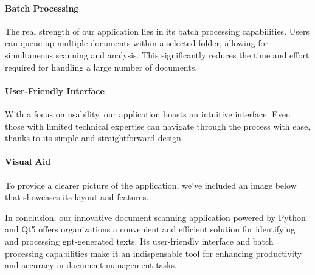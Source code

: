 \paragraph{Batch Processing} The real strength of our application lies in its batch processing capabilities. 
Users can queue up multiple documents within a selected folder, allowing for simultaneous scanning and analysis. 
This significantly reduces the time and effort required for handling a large number of documents.

\paragraph{User-Friendly Interface} With a focus on usability, our application boasts an intuitive interface. 
Even those with limited technical expertise can navigate through the process with ease, thanks to its simple and 
straightforward design.

\paragraph{Visual Aid} To provide a clearer picture of the application, we've included an image below that showcases 
its layout and features.


In conclusion, our innovative document scanning application powered by Python and Qt5 offers organizations a 
convenient and efficient solution for identifying and processing gpt-generated texts. Its user-friendly 
interface and batch processing capabilities make it an indispensable tool for enhancing productivity and accuracy 
in document management tasks.

